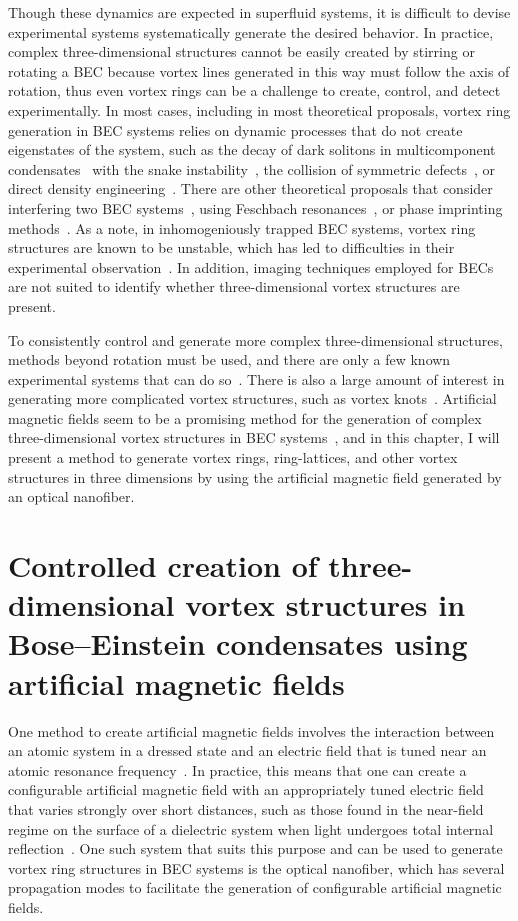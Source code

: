 Though these dynamics are expected in superfluid systems, it is difficult to devise experimental systems systematically generate the desired behavior.
In practice, complex three-dimensional structures cannot be easily created by stirring or rotating a BEC because vortex lines generated in this way must follow the axis of rotation, thus even vortex rings can be a challenge to create, control, and detect experimentally.
In most cases, including in most theoretical proposals, vortex ring generation in BEC systems relies on dynamic processes that do not create eigenstates of the system, such as the decay of dark solitons in multicomponent condensates~\cite{anderson2001} with the snake instability~\cite{ruostekoski2001}, the collision of symmetric defects~\cite{ginsberg2005}, or direct density engineering~\cite{shomroni2009, ruostekoski2005}.
There are other theoretical proposals that consider interfering two BEC systems~\cite{jackson1999}, using Feschbach resonances~\cite{pinsker2013}, or phase imprinting methods~\cite{ruostekoski2001}.
As a note, in inhomogeniously trapped BEC systems, vortex ring structures are known to be unstable, which has led to difficulties in their experimental observation~\cite{abad2008}.
In addition, imaging techniques employed for BECs are not suited to identify whether three-dimensional vortex structures are present.

To consistently control and generate more complex three-dimensional structures, methods beyond rotation must be used, and there are only a few known experimental systems that can do so~\cite{anderson2001,yefsah2013}.
There is also a large amount of interest in generating more complicated vortex structures, such as vortex knots~\cite{maucher2016, kleckner2016, ricca1999}.
Artificial magnetic fields seem to be a promising method for the generation of complex three-dimensional vortex structures in BEC systems~\cite{duncan2019}, and in this chapter, I will present a method to generate vortex rings, ring-lattices, and other vortex structures in three dimensions by using the artificial magnetic field generated by an optical nanofiber.

\section{Controlled creation of three-dimensional vortex structures in Bose--Einstein condensates using artificial magnetic fields}

One method to create artificial magnetic fields involves the interaction between an atomic system in a dressed state and an electric field that is tuned near an atomic resonance frequency~\cite{dalibard2011}.
In practice, this means that one can create a configurable artificial magnetic field with an appropriately tuned electric field that varies strongly over short distances, such as those found in the near-field regime on the surface of a dielectric system when light undergoes total internal reflection~\cite{mochol2015}.
One such system that suits this purpose and can be used to generate vortex ring structures in BEC systems is the optical nanofiber, which has several propagation modes to facilitate the generation of configurable artificial magnetic fields.

